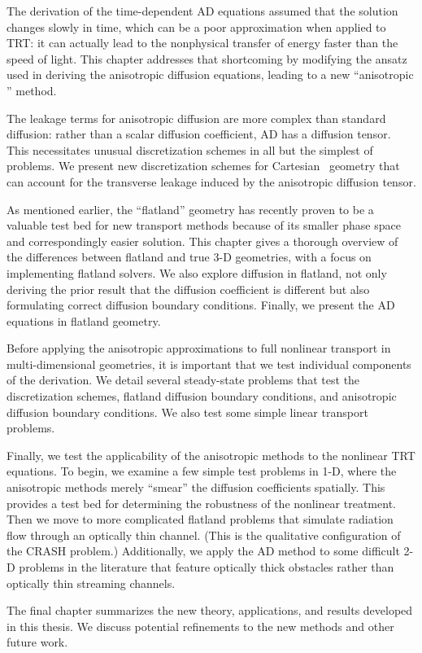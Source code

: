The derivation of the time-dependent AD equations assumed that the solution
changes slowly in time, which can be a poor approximation when applied to
TRT: it can actually lead to the nonphysical transfer of energy faster than the
speed of
light. This chapter addresses that shortcoming by modifying the ansatz used in
deriving the anisotropic diffusion equations, leading to a new ``anisotropic
\Pone'' method.

The leakage terms for anisotropic diffusion are more complex than standard
diffusion: rather than a scalar diffusion coefficient, AD has a diffusion
tensor. This necessitates unusual discretization schemes in all but the simplest
of problems. We present new discretization schemes for Cartesian \xy\ geometry
that can account for the transverse leakage induced by the anisotropic diffusion
tensor.

As mentioned earlier, the ``flatland'' geometry has recently proven to be a
valuable test bed for new transport methods because of its smaller phase space
and correspondingly easier solution. This chapter gives a thorough overview of
the differences between flatland and true 3-D geometries, with a focus on
implementing flatland solvers. We also explore diffusion in flatland, not only
deriving the prior result that the diffusion coefficient is different but also
formulating correct diffusion boundary conditions. Finally, we present the AD
equations in flatland geometry.

Before applying the anisotropic approximations to full nonlinear transport in
multi-dimensional geometries, it is important that we test individual components
of the derivation. We detail several steady-state problems that test the
discretization schemes, flatland diffusion boundary conditions, and anisotropic
diffusion boundary conditions. We also test some simple linear transport
problems.

Finally, we test the applicability of the anisotropic methods to the nonlinear
TRT equations. To begin, we examine a few simple test problems in 1-D, where the
anisotropic methods merely ``smear'' the diffusion coefficients spatially.
This provides a test bed for determining the robustness of the nonlinear
treatment. Then
we move to more complicated flatland problems that simulate radiation flow
through an optically thin channel. (This is the qualitative configuration of
the CRASH problem.)
Additionally, we apply the AD method to some difficult 2-D problems in the
literature that feature optically thick obstacles rather than optically thin
streaming channels.

The final chapter summarizes the new theory, applications, and results developed
in this thesis. We discuss potential refinements to the new
methods and other future work.

